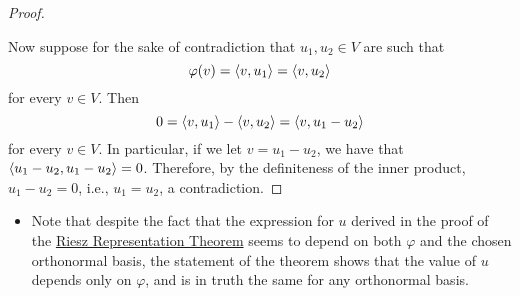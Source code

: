 \documentclass[../main.tex]{subfiles}
\begin{document}
\begin{itemize}
\begin{theorem}
\begin{proof}
\begin{equation*}
            \end{equation*}\par
            Now suppose for the sake of contradiction that $u_1,u_2\in V$ are such that
            \begin{equation*}
                \varphi(v) = \left\langle{v},{u_1}\right\rangle = \left\langle{v},{u_2}\right\rangle
            \end{equation*}
            for every $v\in V$. Then
            \begin{equation*}
                0 = \left\langle{v},{u_1}\right\rangle-\left\langle{v},{u_2}\right\rangle
                = \left\langle{v},{u_1-u_2}\right\rangle
            \end{equation*}
            for every $v\in V$. In particular, if we let $v=u_1-u_2$, we have that $\left\langle{u_1-u_2},{u_1-u_2}\right\rangle=0$. Therefore, by the definiteness of the inner product, $u_1-u_2=0$, i.e., $u_1=u_2$, a contradiction.
        \end{proof}
    \end{theorem}
    \begin{itemize}
        \item Note that despite the fact that the expression for $u$ derived in the proof of the \hyperref[trm:RieszRepresentationTheorem]{Riesz Representation Theorem} seems to depend on both $\varphi$ and the chosen orthonormal basis, the statement of the theorem shows that the value of $u$ depends only on $\varphi$, and is in truth the same for any orthonormal basis.
    \end{itemize}
\end{itemize}
\end{document}
